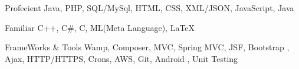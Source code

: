 


\begin{cvskills}


\cvskill
{Profecient} %
{ Java, PHP, SQL/MySql, HTML, CSS, XML/JSON, JavaScript, Java} %


\cvskill
{Familiar} %
{ C++, C\#, C, ML(Meta Language), LaTeX} %


\cvskill
{FrameWorks \& Tools} %
{ Wamp, Composer, MVC, Spring MVC, JSF, Bootstrap , Ajax, HTTP/HTTPS, Crons, AWS, Git, Android , Unit Testing} %



\end{cvskills}